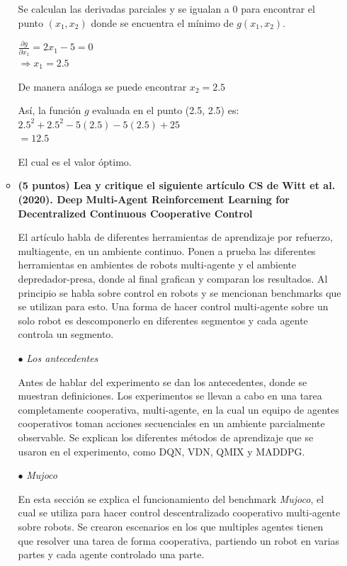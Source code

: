 \documentclass[a4paper,10pt]{article}
\begin{document}
\begin{enumerate}
\begin{itemize}
	   Se calculan las derivadas parciales y se igualan a 0 para encontrar el punto $(x_1, x_2)$ donde se encuentra el mínimo de $g(x_1, x_2)$.
	   
	   $\frac{\partial g}{\partial x_1} = 2x_1 - 5 = 0$\\
	   $\Rightarrow x_1 = 2.5$
	   
	   De manera análoga se puede encontrar $x_2 = 2.5$
	   
	   Así, la función $g$ evaluada en el punto (2.5, 2.5) es:\\
	   $2.5^2 + 2.5^2 -5(2.5) - 5(2.5) + 25$\\
	   $=12.5$
	   
	   El cual es el valor óptimo.
	   
  	  \item \textbf{(5 puntos) Lea y critique el siguiente artículo CS de Witt et al. (2020). Deep Multi-Agent Reinforcement Learning for Decentralized Continuous Cooperative Control}
  	  
  	  El artículo habla de diferentes herramientas de aprendizaje por refuerzo, multiagente, en un ambiente continuo. Ponen a prueba las diferentes herramientas en ambientes de robots multi-agente y el ambiente depredador-presa, donde al final grafican y comparan los resultados. Al principio se habla sobre control en robots y se mencionan benchmarks que se utilizan para esto. Una forma de hacer control multi-agente sobre un solo robot es descomponerlo en diferentes segmentos y cada agente controla un segmento.
  	  
  	  $\bullet$ \textit{Los antecedentes}
  	  
  	  Antes de hablar del experimento se dan los antecedentes, donde se muestran definiciones. Los experimentos se llevan a cabo en una tarea completamente cooperativa, multi-agente, en la cual un equipo de agentes cooperativos toman acciones secuenciales en un ambiente parcialmente observable. Se explican los diferentes métodos de aprendizaje que se usaron en el experimento, como DQN, VDN, QMIX y MADDPG.
  	  
  	  $\bullet$ \textit{Mujoco}
  	  
  	  En esta sección se explica el funcionamiento del benchmark \textit{Mujoco}, el cual se utiliza para hacer control descentralizado cooperativo multi-agente sobre robots. Se crearon escenarios en los que multiples agentes tienen que resolver una tarea de forma cooperativa, partiendo un robot en varias partes y cada agente controlado una parte.
  	  

\end{itemize}
\end{enumerate}
\end{document}
